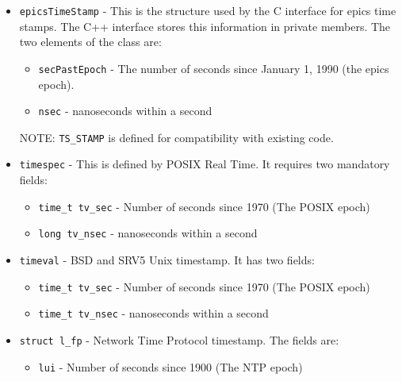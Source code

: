 \begin{itemize}
\item \verb|epicsTimeStamp| - This is the structure used by the C interface for epics time stamps. The C++ interface stores 
this information in private members. The two elements of the class are:

\begin{itemize}

\item \verb|secPastEpoch| - The number of seconds since January 1, 1990 (the epics epoch).

\item \verb|nsec| - nanoseconds within a second

\end{itemize}

NOTE: \verb|TS_STAMP| is defined for compatibility with existing code.

\item \verb|timespec| - This is defined by POSIX Real Time. It requires two mandatory fields:

\begin{itemize}

\item \verb|time_t tv_sec| - Number of seconds since 1970 (The POSIX epoch)

\item \verb|long tv_nsec| - nanoseconds within a second

\end{itemize}

\item \verb|timeval| - BSD and SRV5 Unix timestamp. It has two fields:

\begin{itemize}

\item \verb|time_t tv_sec| - Number of seconds since 1970 (The POSIX epoch)

\item \verb|time_t tv_nsec| - nanoseconds within a second

\end{itemize}

\item \verb|struct l_fp| - Network Time Protocol timestamp. The fields are:

\begin{itemize}

\item \verb|lui| - Number of seconds since 1900 (The NTP epoch)


\end{itemize}
\end{itemize}

